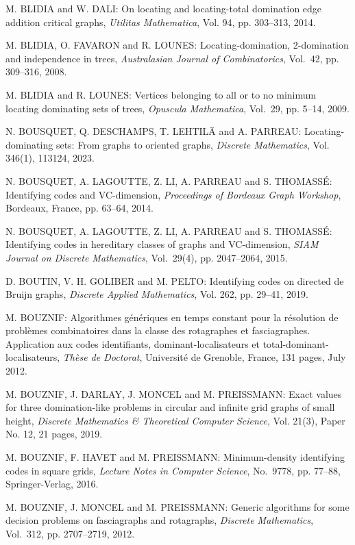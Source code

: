\begin{thebibliography}{999}
M. BLIDIA and W. DALI: On locating and locating-total domination edge addition critical graphs, {\it Utilitas Mathematica}, Vol. 94, pp. 303--313, 2014.

M. BLIDIA, O. FAVARON and R. LOUNES: Locating-domination, 2-domination and independence in trees, {\it Australasian Journal of Combinatorics}, Vol.~42, pp. 309--316, 2008.

M. BLIDIA and R. LOUNES: Vertices belonging to all or to no minimum locating dominating sets of trees, {\it Opuscula Mathematica}, Vol.~29, pp. 5--14, 2009.

N. BOUSQUET, Q. DESCHAMPS, T. LEHTIL\"A and A. PARREAU: Locating-dominating sets: {F}rom graphs to oriented graphs, {\it Discrete Mathematics}, Vol. 346(1), 113124, 2023.

N. BOUSQUET, A. LAGOUTTE, Z. LI, A. PARREAU and S. THO\-MASS\'E: Identifying codes and VC-dimension, {\it Proceedings of Bordeaux Graph Workshop}, Bordeaux, France, pp. 63--64, 2014.

N. BOUSQUET, A. LAGOUTTE, Z. LI, A. PARREAU and S. THO\-MASS\'E: Identifying codes in hereditary classes of graphs and VC-dimension, {\it SIAM Journal on Discrete Mathematics}, Vol.~29(4), pp. 2047--2064, 2015.

D. BOUTIN, V. H. GOLIBER and M. PELTO: Identifying codes on directed de Bruijn graphs, {\it Discrete Applied Mathematics}, Vol. 262, pp. 29--41, 2019.

M. BOUZNIF: Algorithmes g\'en\'eriques en temps constant pour la r\'eso\-lution de probl\`emes combinatoires dans la classe des rotagraphes et fasciagraphes. Application aux codes identifiants, dominant-localisateurs et total-dominant-localisateurs, {\it Th\`ese de Doctorat}, Universit\'e de Grenoble, France, 131 pages, July 2012.

M. BOUZNIF, J. DARLAY, J. MONCEL and M. PREISSMANN: Exact values for three domination-like problems in circular and infinite grid graphs of small height, {\it Discrete Mathematics \& Theoretical Computer Science}, Vol. 21(3), Paper No. 12, 21 pages, 2019.

M. BOUZNIF, F. HAVET and M. PREISSMANN: Minimum-density identifying codes in square grids, {\it Lecture Notes in Computer Science}, No.~9778, pp. 77--88, Springer-Verlag, 2016.

M. BOUZNIF, J. MONCEL and M. PREISSMANN: Generic algorithms for some decision problems on fasciagraphs and rotagraphs, {\it Discrete Mathematics}, Vol.~312, pp. 2707--2719, 2012.


\end{thebibliography}

